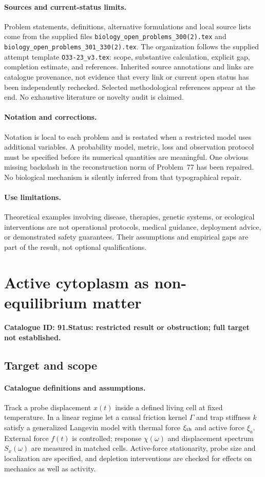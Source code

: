 \documentclass[11pt]{article}
\begin{document}
\paragraph{Sources and current-status limits.}
Problem statements, definitions, alternative formulations and local source lists
come from the supplied files
\texttt{biology\_open\_problems\_300(2).tex} and
\texttt{biology\_open\_problems\_301\_330(2).tex}.
The organization follows the supplied attempt template
\texttt{O33-23\_v3.tex}: scope, substantive calculation, explicit gap,
completion estimate, and references. Inherited source annotations and links are
catalogue provenance, not evidence that every link or current open status has
been independently rechecked. Selected methodological references appear at the
end. No exhaustive literature or novelty audit is claimed.

\paragraph{Notation and corrections.}
Notation is local to each problem and is restated when a restricted model uses
additional variables. A probability model, metric, loss and observation protocol
must be specified before its numerical quantities are meaningful. One obvious
missing backslash in the reconstruction norm of Problem~77 has been repaired.
No biological mechanism is silently inferred from that typographical repair.

\paragraph{Use limitations.}
Theoretical examples involving disease, therapies, genetic systems, or ecological
interventions are not operational protocols, medical guidance, deployment advice,
or demonstrated safety guarantees. Their assumptions and empirical gaps are part
of the result, not optional qualifications.

\setcounter{section}{90}
\section{Active cytoplasm as non-equilibrium matter}
\label{prob:091}
\noindent\textbf{Catalogue ID: 91.}\quad \textbf{Status: restricted result or obstruction; full target not established.}
\subsection{Target and scope}
\paragraph{Catalogue definitions and assumptions.}
Track a probe displacement $x(t)$ inside a defined living cell at fixed temperature. In a linear regime let a causal friction kernel $\Gamma$ and trap stiffness $k$ satisfy a generalized Langevin model with thermal force $\xi_{\rm th}$ and active force $\xi_a$. External force $f(t)$ is controlled; response $\chi(\omega)$ and displacement spectrum $S_x(\omega)$ are measured in matched cells. Active-force stationarity, probe size and localization are specified, and depletion interventions are checked for effects on mechanics as well as activity.
\end{document}
